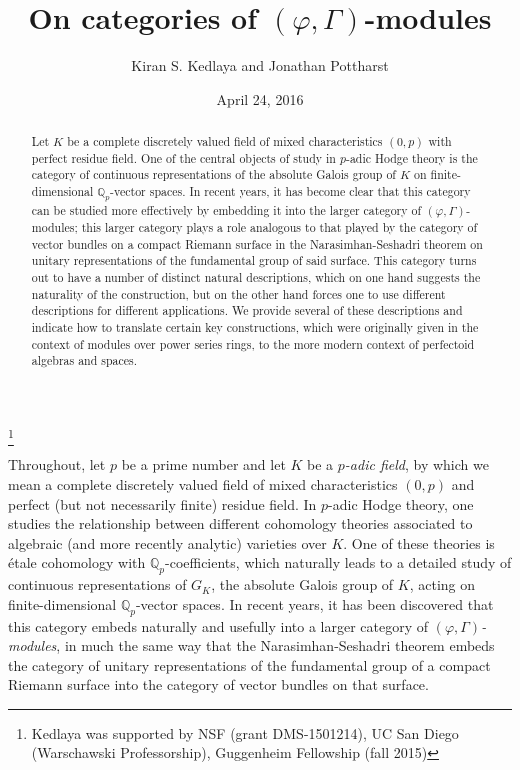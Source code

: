 \documentclass[12pt]{amsart}
\theoremstyle{definition}
\numberwithin{equation}{theorem}
\newcommand{\QQ}{\mathbb{Q}}
\begin{document}
\title{On categories of $(\varphi, \Gamma)$-modules}
\author{Kiran S. Kedlaya and Jonathan Pottharst}
\thanks{Kedlaya was supported by NSF (grant DMS-1501214), UC San Diego (Warschawski Professorship), Guggenheim Fellowship (fall 2015)}
\date{April 24, 2016}

\begin{abstract}
Let $K$ be a complete discretely valued field of mixed characteristics $(0,p)$ with perfect residue field. One of the central objects of study in $p$-adic Hodge theory is the cate\-gory of continuous representations of the absolute Galois group of $K$ on finite-dimensional $\QQ_p$-vector spaces. In recent years, it has become clear that this category can be studied more effectively by embedding it into the larger category of $(\varphi, \Gamma)$-modules; this larger category plays a role analogous to that played by the category of vector bundles on a compact Riemann surface in the Narasimhan-Seshadri theorem on unitary representations of the fundamental group of said surface. This category turns out to have a number of distinct natural descriptions, which on one hand suggests the naturality of the construction, but on the other hand forces one to use different descriptions for different applications. We provide several of these descriptions and indicate how to translate certain key constructions, which were originally given in the context of modules over power series rings, to the more modern context of perfectoid algebras and spaces.
\end{abstract}

\maketitle

Throughout, let $p$ be a prime number and let $K$ be a \emph{$p$-adic field}, by which we mean a complete discretely valued field of mixed characteristics $(0,p)$ and perfect (but not necessarily finite) residue field. In $p$-adic Hodge theory, one studies the relationship between different cohomology theories associated to algebraic (and more recently analytic) varieties over $K$. One of these theories is \'etale cohomology with $\QQ_p$-coefficients, which naturally leads to a detailed study of continuous representations of $G_K$, the absolute Galois group of $K$, acting on finite-dimensional $\QQ_p$-vector spaces. In recent years, it has been discovered that this category embeds naturally and usefully into a larger category of \emph{$(\varphi, \Gamma)$-modules}, in much the same way that the Narasimhan-Seshadri theorem embeds the category of unitary representations of the fundamental group of a compact Riemann surface into the category of vector bundles on that surface.
\end{document}

